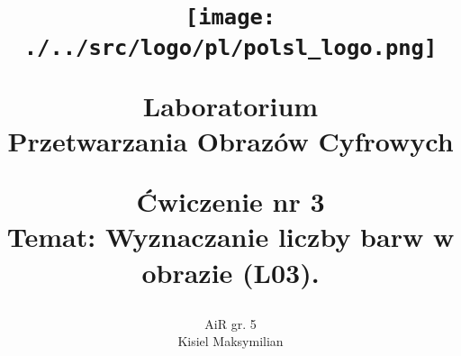 \title{
\centering

\vspace{-5.0cm} %

\begin{flushright}
    \texttt{[image: ./../src/logo/pl/polsl\_logo.png]}\\ %
\end{flushright}

\vspace*{2.7cm} %

{\fontsize{24}{30}\selectfont\textbf{Laboratorium \\
Przetwarzania Obrazów Cyfrowych}}\\
\vspace*{4.2cm}

{\fontsize{14}{0}\selectfont 
Ćwiczenie nr 3 \\[-1.2em] 
Temat: Wyznaczanie liczby barw w obrazie (L03).
}
\vspace*{4.2cm} %
}
\author{
\begin{minipage}{1\linewidth}
    \begin{flushright}
        {\begin{minipage}[t]{.28\linewidth}
            AiR gr. 5 \\
            Kisiel Maksymilian
        \end{minipage}}
    \end{flushright}
\end{minipage}
}


